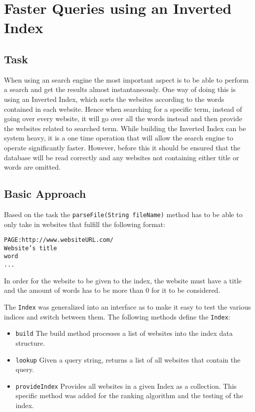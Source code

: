 \chapter{Faster Queries using an Inverted Index}


\section{Task}
When using an search engine the most important aspect is to be able to perform a search and get the results almost instantaneously. One way of doing this is using an Inverted Index, which sorts the websites according to the words contained in each website. Hence when searching for a specific term, instead of going over every website, it will go over all the words instead and then provide the websites related to searched term. While building the Inverted Index can be system heavy, it is a one time operation that will allow the search engine to operate significantly faster. However, before this it should be ensured that the database will be read correctly and any websites not containing either title or words are omitted.

\section{Basic Approach}
Based on the task the {\tt parseFile(String fileName)} method has to be able to only take in websites that fulfill the following format:

{\tt *PAGE:http://www.websiteURL.com/} \\
{\tt Website's title} \\
{\tt word} \\
{\tt ...}

In order for the website to be given to the index, the website must have a title and the amount of words has to be more than 0 for it to be considered.

The {\tt Index} was generalized into an interface as to make it easy to test the various indices and switch between them. The following methods define the {\tt Index}:
\begin{itemize}
    \item {\tt build} The build method processes a list of websites into the index data structure.
    \item {\tt lookup} Given a query string, returns a list of all websites that contain the query.
    \item {\tt provideIndex} Provides all websites in a given Index as a collection. This specific method was added for the ranking algorithm and the testing of the index.
\end{itemize}

